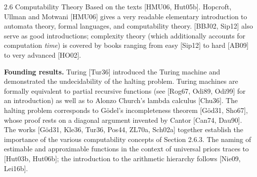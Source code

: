 \documentclass[aspectratio=169,10pt]{beamer}
\begin{document}
\begin{frame}{2.6 Computability Theory}
  Based on the texts [HMU06, Hut05b]. Hopcroft, Ullman and Motwani [HMU06]
  gives a very readable elementary introduction to automata theory, formal
  languages, and computability theory. [BBJ02, Sip12] also serve as good
  introductions; complexity theory (which additionally accounts for
  computation \emph{time}) is covered by books ranging from easy [Sip12]
  to hard [AB09] to very advanced [HO02].

  \textbf{Founding results.} Turing [Tur36] introduced the Turing machine
  and demonstrated the undecidability of the halting problem. Turing
  machines are formally equivalent to partial recursive functions (see
  [Rog67, Odi89, Odi99] for an introduction) as well as to Alonzo Church's
  lambda calculus [Chu36]. The halting problem corresponds to Gödel's
  incompleteness theorem [Göd31, Sho67], whose proof rests on a diagonal
  argument invented by Cantor [Can74, Dau90]. The works [Göd31, Kle36,
  Tur36, Pos44, ZL70a, Sch02a] together establish the importance of the
  various computability concepts of Section 2.6.3. The naming of estimable
  and approximable functions in the context of universal priors traces to
  [Hut03b, Hut06b]; the introduction to the arithmetic hierarchy follows
  [Nie09, Lei16b].
\end{frame}
\end{document}
